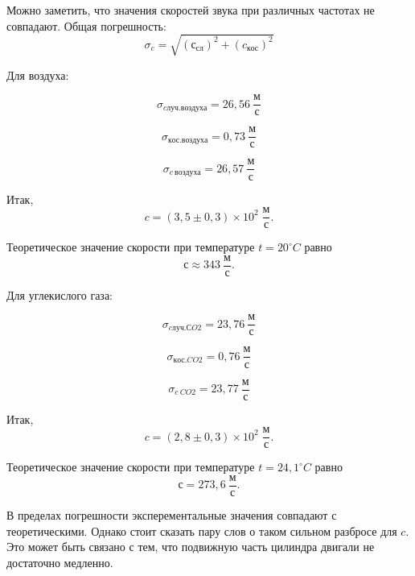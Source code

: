 \documentclass[11pt,a4paper,oneside]{article}
\begin{document}
\begin{enumerate}
\newpage
		Можно заметить, что значения скоростей звука при различных частотах не совпадают.
		Общая погрешность: $$\sigma_{c} = \sqrt{(с_{сл})^2+(c_{кос})^2}$$

		Для воздуха:

		$$\sigma_{cлуч. воздуха} = 26,56 \: \frac{м}{с}$$

		$$\sigma_{кос. воздуха} = 0,73 \: \frac{м}{с}$$

		$$\sigma_{c\:воздуха} = 26,57  \: \frac{м}{с}$$

		Итак, $$c = \left(3,5 \pm 0,3\right) \times 10^{2}\; \frac{м}{с}.$$

		Теоретическое значение скорости при температуре $t = 20 ^\circ C$ равно $$с \approx 343 \: \frac{м}{с}.$$

		Для углекислого газа:

		$$\sigma_{cлуч. СO2} = 23,76 \: \frac{м}{с}$$

		$$\sigma_{кос.CO2} = 0,76\: \frac{м}{с}$$

		$$\sigma_{c\:CO2} = 23,77  \: \frac{м}{с}$$

		Итак, $$c = \left(2,8 \pm 0,3\right) \times 10^{2} \; \frac{м}{с}.$$
		
		Теоретическое значение скорости при температуре $t = 24,1 ^\circ C$ равно $$с = 273,6 \: \frac{м}{с}.$$
		
		В пределах погрешности эксперементальные значения совпадают с теоретическими.
		Однако стоит сказать пару слов о таком сильном разбросе для $c$. Это может быть связано с тем, что подвижную часть цилиндра двигали не достаточно медленно.
		

\end{enumerate}
\end{document}
